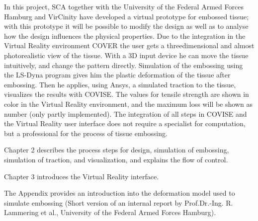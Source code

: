 In this project, SCA together with the University of the Federal Armed Forces Hamburg 
and VirCinity have developed a virtual 
prototype for embossed tissue; with this prototype it will be possible to modify the 
design as well as to analyse how the design influences the physical properties. 
Due to the integration in the Virtual Reality environment COVER the user gets a threedimensional and 
almost photorealistic view of the tissue. With a 3D input device he can move the 
tissue intuitively, and change the pattern directly. Simulation of the embossing using 
the LS-Dyna program gives him the  plastic deformation of the tissue after embossing. 
Then he applies, using Ansys, a simulated traction to the tissue, visualizes the results with COVISE. The values for tensile strength are 
shown in color in the Virtual Reality environment, and the maximum loss will be 
shown as number (only partly implemented). The integration of all steps in COVISE and the Virtual Reality user interface 
does not require a specialist for computation, but a professional for the process of tissue embossing.

Chapter 2 describes the process steps for design, simulation of embossing, simulation 
of traction, and visualization, and  explains the flow of control.

Chapter 3 introduces the Virtual Reality interface.

The Appendix provides an introduction into the deformation model used to simulate
embossing (Short version of an internal report by Prof.Dr.-Ing. R. Lammering et
al., University of the Federal Armed Forces Hamburg).


 

